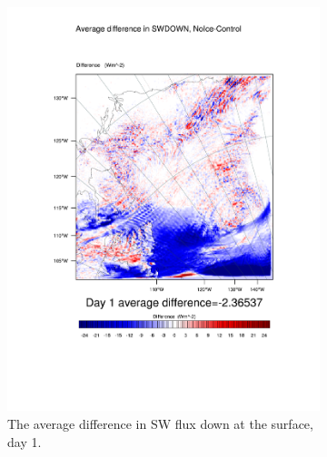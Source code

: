 \begin{figure}
\centering
	\begin{subfigure}{0.48\textwidth}
		\includegraphics[width=\textwidth]{results/noice/diff_NoIce_SWDOWN_Day1.pdf}
		\caption{The average difference in SW flux down at the surface, day 1.}
		\label{subfig:swdown_r2Day1}
	\end{subfigure}
	\quad
	\begin{subfigure}{0.48\textwidth}
		\centering

\end{subfigure}
\end{figure}
